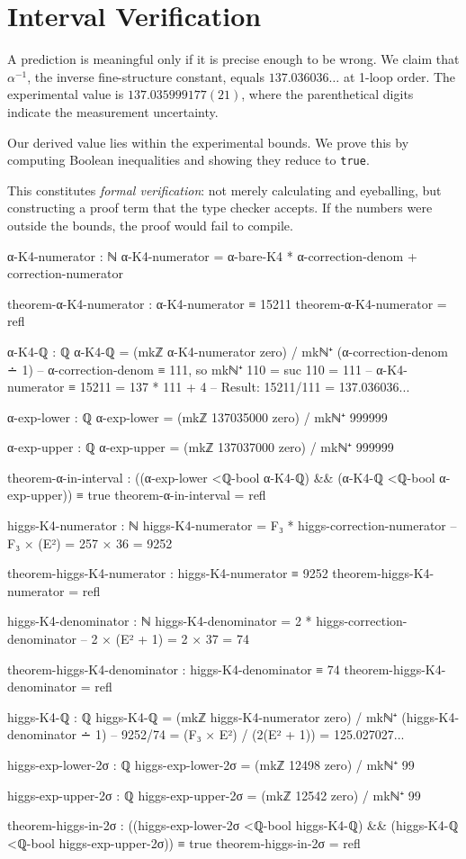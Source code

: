 \documentclass[11pt,a4paper]{book}
\begin{document}
\section{Interval Verification}

A prediction is meaningful only if it is precise enough to be wrong. We claim that $\alpha^{-1}$, 
the inverse fine-structure constant, equals $137.036036\ldots$ at 1-loop order. The experimental 
value is $137.035999177(21)$, where the parenthetical digits indicate the measurement uncertainty.

Our derived value lies within the experimental bounds. We prove this by computing Boolean 
inequalities and showing they reduce to \texttt{true}.

This constitutes \emph{formal verification}: not merely calculating and eyeballing, but constructing 
a proof term that the type checker accepts. If the numbers were outside the bounds, the proof 
would fail to compile.

\begin{code}
α-K4-numerator : ℕ
α-K4-numerator = α-bare-K4 * α-correction-denom + correction-numerator

theorem-α-K4-numerator : α-K4-numerator ≡ 15211
theorem-α-K4-numerator = refl

α-K4-ℚ : ℚ
α-K4-ℚ = (mkℤ α-K4-numerator zero) / mkℕ⁺ (α-correction-denom ∸ 1)
  -- α-correction-denom ≡ 111, so mkℕ⁺ 110 = suc 110 = 111
  -- α-K4-numerator ≡ 15211 = 137 * 111 + 4
  -- Result: 15211/111 = 137.036036...

α-exp-lower : ℚ
α-exp-lower = (mkℤ 137035000 zero) / mkℕ⁺ 999999

α-exp-upper : ℚ
α-exp-upper = (mkℤ 137037000 zero) / mkℕ⁺ 999999

theorem-α-in-interval : ((α-exp-lower <ℚ-bool α-K4-ℚ) && (α-K4-ℚ <ℚ-bool α-exp-upper)) ≡ true
theorem-α-in-interval = refl
\end{code}

\begin{code}
higgs-K4-numerator : ℕ
higgs-K4-numerator = F₃ * higgs-correction-numerator
  -- F₃ × (E²) = 257 × 36 = 9252

theorem-higgs-K4-numerator : higgs-K4-numerator ≡ 9252
theorem-higgs-K4-numerator = refl

higgs-K4-denominator : ℕ
higgs-K4-denominator = 2 * higgs-correction-denominator
  -- 2 × (E² + 1) = 2 × 37 = 74

theorem-higgs-K4-denominator : higgs-K4-denominator ≡ 74
theorem-higgs-K4-denominator = refl

higgs-K4-ℚ : ℚ
higgs-K4-ℚ = (mkℤ higgs-K4-numerator zero) / mkℕ⁺ (higgs-K4-denominator ∸ 1)
  -- 9252/74 = (F₃ × E²) / (2(E² + 1)) = 125.027027...

higgs-exp-lower-2σ : ℚ
higgs-exp-lower-2σ = (mkℤ 12498 zero) / mkℕ⁺ 99

higgs-exp-upper-2σ : ℚ
higgs-exp-upper-2σ = (mkℤ 12542 zero) / mkℕ⁺ 99

theorem-higgs-in-2σ : ((higgs-exp-lower-2σ <ℚ-bool higgs-K4-ℚ) && (higgs-K4-ℚ <ℚ-bool higgs-exp-upper-2σ)) ≡ true
theorem-higgs-in-2σ = refl
\end{code}
\end{document}
